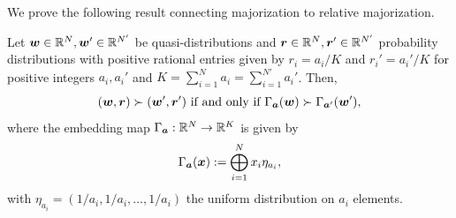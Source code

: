 \documentclass[pra,
aps,
twocolumn,
superscriptaddress,
groupedaddress,
nofootinbib,
reprint
]{revtex4-1}
\begin{document}
We prove the following result connecting majorization to relative majorization.
\begin{lemma}
	Let $\boldsymbol{w}\in \mathbb{R}^N, \boldsymbol{w}'\in \mathbb{R}^{N'}$ be quasi-distributions and $\boldsymbol{r}\in \mathbb{R}^N, \boldsymbol{r}'\in \mathbb{R}^{N'}$ probability distributions with positive rational entries given by $r_i = a_i/K$ and $r_i' = a_i'/K$ for positive integers $a_i, a_i'$ and $K = \sum_{i=1}^N a_i = \sum_{i=1}^{N'} a_i'$. 
Then,
\begin{equation}
(\boldsymbol{w}, \boldsymbol{r}) \succ (\boldsymbol{w}', \boldsymbol{r}') \mbox{ if and only if } \Gamma_{\bm{a}} (\boldsymbol{w}) \succ \Gamma_{\bm{a}'} (\boldsymbol{w}'),
\end{equation}
where the embedding map $\Gamma_{\bm{a}} :\mathbb{R}^N \rightarrow \mathbb{R}^K$ is given by
\begin{equation}
	\Gamma_{\bm{a}}(\boldsymbol{x}) := \bigoplus_{i=1}^N x_i \eta_{a_i},
\end{equation}
with $\eta_{a_i} = (1/a_i, 1/a_i, \dots, 1/a_i)$ the uniform distribution on $a_i$ elements.
\end{lemma}
\end{document}
